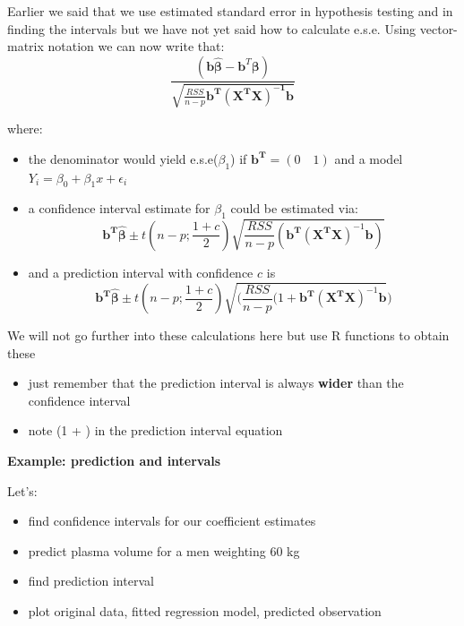 \documentclass[
]{book}
\providecommand{\tightlist}{%
  \setlength{\itemsep}{0pt}\setlength{\parskip}{0pt}}
\theoremstyle{definition}
\theoremstyle{definition}
\theoremstyle{definition}
\theoremstyle{remark}
\begin{document}
Earlier we said that we use estimated standard error in hypothesis testing and in finding the intervals but we have not yet said how to calculate e.s.e. Using vector-matrix notation we can now write that:
\[\frac{(\mathbf{b}\hat{{\boldsymbol\beta}}-\mathbf{b}^T\boldsymbol\beta)}{\sqrt{\frac{RSS}{n-p}\mathbf{b^T(X^TX)^{-1}b}}}\]

where:

\begin{itemize}
\item
  the denominator would yield e.s.e(\(\beta_1\)) if \(\mathbf{b^T}=(0 \quad 1)\) and a model \(Y_i = \beta_0 + \beta_1x + \epsilon_i\)
\item
  a confidence interval estimate for \(\beta_1\) could be estimated via:
  \[\mathbf{b^T}\hat{\boldsymbol\beta} \pm t(n-p; \frac{1+c}{2})\sqrt{\frac{RSS}{n-p}(\mathbf{b^T}(\mathbf{X^T}\mathbf{X})^{-1}\mathbf{b})}\]
\item
  and a prediction interval with confidence \(c\) is
  \[\mathbf{b^T}\hat{\boldsymbol\beta} \pm t(n-p; \frac{1+c}{2})\sqrt{(\frac{RSS}{n-p}(1+\mathbf{b^T}(\mathbf{X^T}\mathbf{X})^{-1}\mathbf{b}})\]
\end{itemize}

We will not go further into these calculations here but use R functions to obtain these

\begin{itemize}
\tightlist
\item
  just remember that the prediction interval is always \textbf{wider} than the confidence interval
\item
  note (1 + ) in the prediction interval equation
\end{itemize}

\textbf{Example: prediction and intervals}

Let's:

\begin{itemize}
\tightlist
\item
  find confidence intervals for our coefficient estimates
\item
  predict plasma volume for a men weighting 60 kg
\item
  find prediction interval
\item
  plot original data, fitted regression model, predicted observation
\end{itemize}
\end{document}
